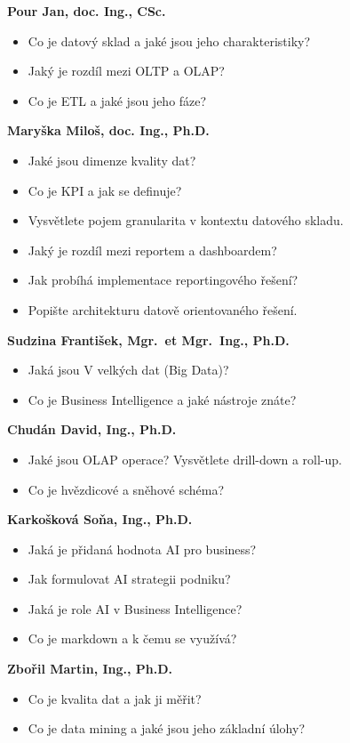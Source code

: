 \begin{profesorbox}
\textbf{Pour Jan, doc. Ing., CSc.}
\begin{itemize}
  \item Co je datový sklad a jaké jsou jeho charakteristiky?
  \item Jaký je rozdíl mezi OLTP a OLAP?
  \item Co je ETL a jaké jsou jeho fáze?
\end{itemize}
\textbf{Maryška Miloš, doc. Ing., Ph.D.}
\begin{itemize}
  \item Jaké jsou dimenze kvality dat?
  \item Co je KPI a jak se definuje?
  \item Vysvětlete pojem granularita v kontextu datového skladu.
  \item Jaký je rozdíl mezi reportem a dashboardem?
  \item Jak probíhá implementace reportingového řešení?
  \item Popište architekturu datově orientovaného řešení.
\end{itemize}
\textbf{Sudzina František, Mgr.\ et Mgr.\ Ing., Ph.D.}
\begin{itemize}
  \item Jaká jsou V velkých dat (Big Data)?
  \item Co je Business Intelligence a jaké nástroje znáte?
\end{itemize}
\textbf{Chudán David, Ing., Ph.D.}
\begin{itemize}
  \item Jaké jsou OLAP operace? Vysvětlete drill-down a roll-up.
  \item Co je hvězdicové a sněhové schéma?
\end{itemize}
\textbf{Karkošková Soňa, Ing., Ph.D.}
\begin{itemize}
  \item Jaká je přidaná hodnota AI pro business?
  \item Jak formulovat AI strategii podniku?
  \item Jaká je role AI v Business Intelligence?
  \item Co je markdown a k čemu se využívá?
\end{itemize}
\textbf{Zbořil Martin, Ing., Ph.D.}
\begin{itemize}
  \item Co je kvalita dat a jak ji měřit?
  \item Co je data mining a jaké jsou jeho základní úlohy?

\end{itemize}
\end{profesorbox}

